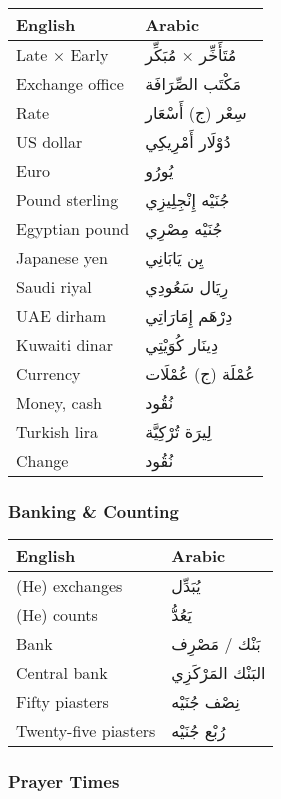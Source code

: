 \documentclass[
  a4paper,
  DIV=11,
  numbers=noendperiod]{scrartcl}
\begin{document}
\begin{longtable}[]{@{}ll@{}}
\toprule\noalign{}
English & Arabic \\
\midrule\noalign{}
\endhead
\bottomrule\noalign{}
\endlastfoot
Late × Early & مُتَأَخِّر × مُبَكِّر \\
Exchange office & مَكْتَب الصِّرَافَة \\
Rate & سِعْر (ج) أَسْعَار \\
US dollar & دُوْلَار أَمْرِيكِي \\
Euro & يُورُو \\
Pound sterling & جُنَيْه إِنْجِلِيزِي \\
Egyptian pound & جُنَيْه مِصْرِي \\
Japanese yen & يِن يَابَانِي \\
Saudi riyal & رِيَال سَعُودِي \\
UAE dirham & دِرْهَم إِمَارَاتِي \\
Kuwaiti dinar & دِينَار كُوَيْتِي \\
Currency & عُمْلَة (ج) عُمْلَات \\
Money, cash & نُقُود \\
Turkish lira & لِيرَة تُرْكِيَّة \\
Change & نُقُود \\
\end{longtable}

\subsubsection{Banking \& Counting}\label{banking-counting}

\begin{longtable}[]{@{}ll@{}}
\toprule\noalign{}
English & Arabic \\
\midrule\noalign{}
\endhead
\bottomrule\noalign{}
\endlastfoot
(He) exchanges & يُبَدِّل \\
(He) counts & يَعُدُّ \\
Bank & بَنْك / مَصْرِف \\
Central bank & البَنْك المَرْكَزِي \\
Fifty piasters & نِصْف جُنَيْه \\
Twenty-five piasters & رُبْع جُنَيْه \\
\end{longtable}

\subsubsection{Prayer Times}\label{prayer-times}
\end{document}
